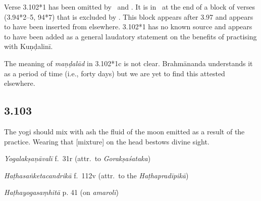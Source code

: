 \begin{ekdosis}
\begin{philcomm}[hp03_102_1]
Verse 3.102*1 has been omitted by \alphaOne\ and \alphaThree. It is in \alphaTwo\ at the end of a block of verses (3.94*2–5, 94*7) that is excluded by \alphaThree. This block appears after 3.97 and appears to have been inserted from elsewhere. 3.102*1 has no known source and appears to have been added as a general laudatory statement on the benefits of practising with Kuṇḍalinī.\lb

The meaning of \emph{maṇḍalād} in 3.102*1c is not clear. Brahmānanda understands it as a period of time (i.e., forty days) but we are yet to find this attested elsewhere.
\end{philcomm}


\subsection*{3.103}
\begin{translation}[hp03_103]
The yogi should mix with ash the fluid of the moon emitted as a result of the practice. Wearing that [mixture] on the head bestows divine sight.
\end{translation}


\begin{testimonia}[hp03_103]
\emph{Yogalakṣaṇāvalī} f.~31r  (attr.~to \emph{Gorakṣaśataka})
\begin{versinnote}
\end{versinnote}

\emph{Haṭhasaṅketacandrikā} f.~112v (attr.~to the \emph{Haṭhapradīpikā})
\begin{versinnote}
\end{versinnote}

\emph{Haṭhayogasaṃhitā} p. 41 (on \emph{amarolī})
\begin{versinnote}
\end{versinnote}
\end{testimonia}


\end{ekdosis}

